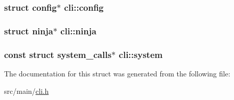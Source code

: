 \hypertarget{structcli_a28dc99e6c98ca10ed948568b73c70895}{
\subsubsection[{config}]{\setlength{\rightskip}{0pt plus 5cm}struct {\bf config}$\ast$ cli\+::config}}\label{structcli_a28dc99e6c98ca10ed948568b73c70895}
\hypertarget{structcli_a980bb0b8ad40cdc259b0534ae257ef6f}{
\subsubsection[{ninja}]{\setlength{\rightskip}{0pt plus 5cm}struct {\bf ninja}$\ast$ cli\+::ninja}}\label{structcli_a980bb0b8ad40cdc259b0534ae257ef6f}
\hypertarget{structcli_ab655c84a74f70154b6ad959f3d3e42f9}{
\subsubsection[{system}]{\setlength{\rightskip}{0pt plus 5cm}const struct {\bf system\+\_\+calls}$\ast$ cli\+::system}}\label{structcli_ab655c84a74f70154b6ad959f3d3e42f9}


The documentation for this struct was generated from the following file\+:\begin{DoxyCompactItemize}
\item 
src/main/\hyperlink{cli_8h}{cli.\+h}\end{DoxyCompactItemize}
